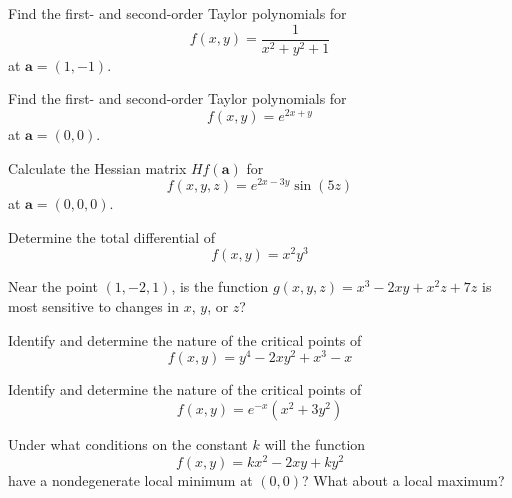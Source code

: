 \documentclass[boxes]{gsypset}
\begin{document}
\begin{problem}[4.1.9]
	Find the first- and second-order Taylor polynomials for
	\[
		f(x,y) = \frac{1}{x^2 + y^2 + 1}
	\]
	at $\mathbf{a} = (1,-1)$.
\end{problem}
\begin{solution}
	
\end{solution}

\begin{problem}[4.1.10]
	Find the first- and second-order Taylor polynomials for
	\[
		f(x,y) = e^{2x + y}
	\]
	at $\mathbf{a} = (0,0)$.
\end{problem}
\begin{solution}
	
\end{solution}

\begin{problem}[4.1.20]
	Calculate the Hessian matrix $H f(\mathbf{a})$ for
	\[
		f(x,y,z) = e^{2x - 3y} \sin(5z)
	\]
	at $\mathbf{a} = (0,0,0)$.
\end{problem}
\begin{solution}
	
\end{solution}

\begin{problem}[4.1.28]
	Determine the total differential of
	\[
		f(x,y) = x^2 y^3
	\]
\end{problem}
\begin{solution}
	
\end{solution}

\begin{problem}[4.1.34]
	Near the point $(1,-2,1)$, is the function
	$g(x,y,z) = x^3 - 2xy + x^2z + 7z$
	is most sensitive to changes in $x$, $y$, or $z$?
\end{problem}
\begin{solution}
	
\end{solution}

\begin{problem}[4.2.6]
	Identify and determine the nature of the critical points of
	\[
		f(x,y) = y^4 - 2xy^2 + x^3 - x
	\]
\end{problem}
\begin{solution}
	
\end{solution}

\begin{problem}[4.2.12]
	Identify and determine the nature of the critical points of
	\[
		f(x,y) = e^{-x} (x^2 + 3y^2)
	\]
\end{problem}
\begin{solution}
	
\end{solution}

\begin{problem}[4.2.22a]
	Under what conditions on the constant $k$ will the function
	\[
		f(x,y) = kx^2 - 2xy + ky^2
	\]
	have a nondegenerate local minimum at $(0,0)$?
	What about a local maximum?
\end{problem}
\begin{solution}
	
\end{solution}
\end{document}
